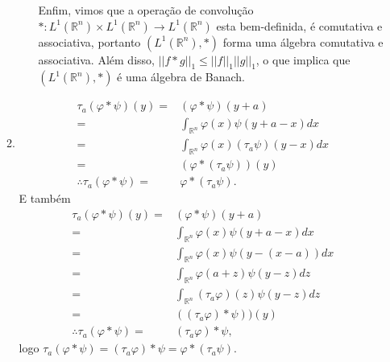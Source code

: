 \documentclass{article}
\begin{document}
\begin{enumerate}
\begin{enumerate}
\begin{enumerate}
					Enfim, vimos que a operação de convolução $* : L^{1}(\mathbb{R}^{n}) \times L^{1}(\mathbb{R}^{n}) \to L^{1}(\mathbb{R}^{n})$ esta bem-definida, é comutativa e associativa, portanto $(L^{1}(\mathbb{R}^{n}), *)$ forma uma álgebra comutativa e associativa. Além disso, $||f*g||_{1} \leq ||f||_{1}||g||_{1}$, o que implica que $(L^{1}(\mathbb{R}^{n}), *)$ é uma álgebra de Banach.
					\end{enumerate}
				\item 
				$$
				\begin{aligned}
				\tau_{a}(\varphi*\psi)(y)= & (\varphi*\psi)(y+a) 
				\\
				= & \int_{\mathbb{R}^{n}}\varphi(x)\psi(y+a-x)dx
				\\
				= & \int_{\mathbb{R}^{n}}\varphi(x)(\tau_{a}\psi)(y-x)dx
				\\
				= & (\varphi*(\tau_{a}\psi))(y)
				\\
				\therefore \tau_{a}(\varphi*\psi) = & \varphi*(\tau_{a}\psi).
				\end{aligned}
				$$
				E também
				$$
				\begin{aligned}
				\tau_{a}(\varphi*\psi)(y)= & (\varphi*\psi)(y+a) 
				\\
				= & \int_{\mathbb{R}^{n}}\varphi(x)\psi(y+a-x)dx
				\\
				= & \int_{\mathbb{R}^{n}}\varphi(x)\psi(y-(x-a))dx
				\\
				= & \int_{\mathbb{R}^{n}}\varphi(a+z)\psi(y-z)dz
				\\
				= & \int_{\mathbb{R}^{n}} (\tau_{a}\varphi)(z)\psi(y-z)dz
				\\
				= & ((\tau_{a}\varphi)*\psi))(y)
				\\
				\therefore \tau_{a}(\varphi*\psi) = & (\tau_{a}\varphi)*\psi,
				\end{aligned}
				$$
				logo $\tau_{a}(\varphi*\psi) = (\tau_{a}\varphi)*\psi = \varphi*(\tau_{a}\psi)$.
				

\end{enumerate}
\end{enumerate}
\end{document}
